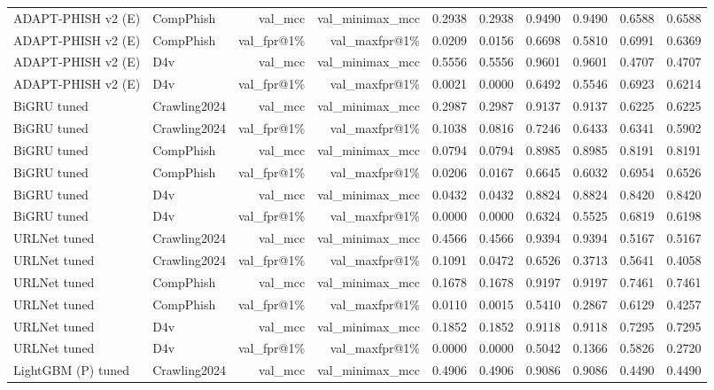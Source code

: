 \begin{table}[t]
\begin{tabular}{llrrrrrrrr}
ADAPT-PHISH v2 (E) & CompPhish & val\_mcc & val\_minimax\_mcc & 0.2938 & 0.2938 & 0.9490 & 0.9490 & 0.6588 & 0.6588 \\
ADAPT-PHISH v2 (E) & CompPhish & val\_fpr@1\% & val\_maxfpr@1\% & 0.0209 & 0.0156 & 0.6698 & 0.5810 & 0.6991 & 0.6369 \\
ADAPT-PHISH v2 (E) & D4v & val\_mcc & val\_minimax\_mcc & 0.5556 & 0.5556 & 0.9601 & 0.9601 & 0.4707 & 0.4707 \\
ADAPT-PHISH v2 (E) & D4v & val\_fpr@1\% & val\_maxfpr@1\% & 0.0021 & 0.0000 & 0.6492 & 0.5546 & 0.6923 & 0.6214 \\
BiGRU tuned & Crawling2024 & val\_mcc & val\_minimax\_mcc & 0.2987 & 0.2987 & 0.9137 & 0.9137 & 0.6225 & 0.6225 \\
BiGRU tuned & Crawling2024 & val\_fpr@1\% & val\_maxfpr@1\% & 0.1038 & 0.0816 & 0.7246 & 0.6433 & 0.6341 & 0.5902 \\
BiGRU tuned & CompPhish & val\_mcc & val\_minimax\_mcc & 0.0794 & 0.0794 & 0.8985 & 0.8985 & 0.8191 & 0.8191 \\
BiGRU tuned & CompPhish & val\_fpr@1\% & val\_maxfpr@1\% & 0.0206 & 0.0167 & 0.6645 & 0.6032 & 0.6954 & 0.6526 \\
BiGRU tuned & D4v & val\_mcc & val\_minimax\_mcc & 0.0432 & 0.0432 & 0.8824 & 0.8824 & 0.8420 & 0.8420 \\
BiGRU tuned & D4v & val\_fpr@1\% & val\_maxfpr@1\% & 0.0000 & 0.0000 & 0.6324 & 0.5525 & 0.6819 & 0.6198 \\
URLNet tuned & Crawling2024 & val\_mcc & val\_minimax\_mcc & 0.4566 & 0.4566 & 0.9394 & 0.9394 & 0.5167 & 0.5167 \\
URLNet tuned & Crawling2024 & val\_fpr@1\% & val\_maxfpr@1\% & 0.1091 & 0.0472 & 0.6526 & 0.3713 & 0.5641 & 0.4058 \\
URLNet tuned & CompPhish & val\_mcc & val\_minimax\_mcc & 0.1678 & 0.1678 & 0.9197 & 0.9197 & 0.7461 & 0.7461 \\
URLNet tuned & CompPhish & val\_fpr@1\% & val\_maxfpr@1\% & 0.0110 & 0.0015 & 0.5410 & 0.2867 & 0.6129 & 0.4257 \\
URLNet tuned & D4v & val\_mcc & val\_minimax\_mcc & 0.1852 & 0.1852 & 0.9118 & 0.9118 & 0.7295 & 0.7295 \\
URLNet tuned & D4v & val\_fpr@1\% & val\_maxfpr@1\% & 0.0000 & 0.0000 & 0.5042 & 0.1366 & 0.5826 & 0.2720 \\
LightGBM (P) tuned & Crawling2024 & val\_mcc & val\_minimax\_mcc & 0.4906 & 0.4906 & 0.9086 & 0.9086 & 0.4490 & 0.4490 \\

\end{tabular}
\end{table}
